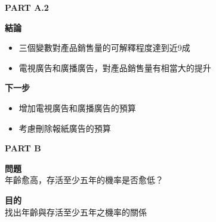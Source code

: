 \documentclass[12pt,aspectratio=43]{beamer}
\begin{document}
\begin{frame}[t]{\textbf{PART A.2}}
\vspace*{10pt}
{\Large \setlength{\baselineskip}{20pt} \parbox{\linewidth}{\raggedright \textbf{結論}}}
\begin{itemize}
\setlength{\itemsep}{10pt}
\item 三個變數對產品銷售量的可解釋程度達到近9成
\item 電視廣告和廣播廣告，對產品銷售量有相當大的提升
\end{itemize}
\vspace*{30pt}

{\Large \setlength{\baselineskip}{20pt} \parbox{\linewidth}{\raggedright \textbf{下一步}}}
\begin{itemize}
\setlength{\itemsep}{10pt}
\item 增加電視廣告和廣播廣告的預算
\item 考慮刪除報紙廣告的預算
\end{itemize}
\textbf{}

\end{frame}

\begin{frame}[t]{\textbf{PART B}}
\vspace*{10pt}

{
\setlength{\baselineskip}{1.5\baselineskip}
{
\Large
\parbox{\linewidth}{\raggedright \textbf{問題}\\
年齡愈高，存活至少五年的機率是否愈低？}
}

\vspace*{2cm}

{
\Large \parbox{\linewidth}{\raggedright \textbf{目的}\\
找出年齡與存活至少五年之機率的關係}
}
}
\end{frame}
\end{document}
